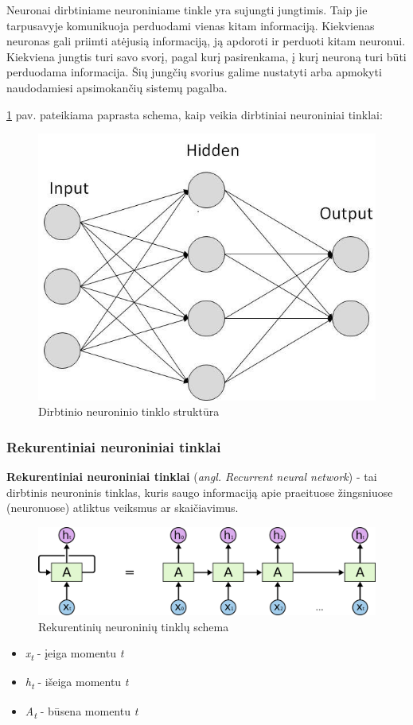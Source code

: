\documentclass{VUMIFInfKursinis}
\begin{document}
Neuronai dirbtiniame neuroniniame tinkle yra sujungti jungtimis. Taip jie tarpusavyje komunikuoja perduodami vienas kitam informaciją. Kiekvienas neuronas gali priimti atėjusią informaciją, ją apdoroti ir perduoti kitam neuronui. Kiekviena jungtis turi savo svorį, pagal kurį pasirenkama, į kurį neuroną turi būti perduodama informacija. Šių jungčių svorius galime nustatyti arba apmokyti naudodamiesi apsimokančių sistemų pagalba. 

\ref{img:ann} pav. pateikiama paprasta schema, kaip veikia dirbtiniai neuroniniai tinklai:

\begin{figure}[H]
	\centering
	\includegraphics[width=.4\linewidth]{img/ann}
	\caption{Dirbtinio neuroninio tinklo struktūra \cite{ArtificialNeuralNetwork}}
	\label{img:ann}
\end{figure}


\subsubsection{Rekurentiniai neuroniniai tinklai}
\textbf{Rekurentiniai neuroniniai tinklai} (\textit{angl. Recurrent neural network}) - tai dirbtinis neuroninis tinklas, kuris saugo informaciją apie praeituose žingsniuose (neuronuose) atliktus veiksmus ar skaičiavimus.

\begin{figure}[H]
	\centering
	\includegraphics[width=.8\linewidth]{img/rnn}
	\caption{Rekurentinių neuroninių tinklų schema \cite{RecurrentNeuralNetwork}}
	\label{img:rnn}
\end{figure}
\begin{itemize}
	\item \textit{x\textsubscript{t}} - įeiga momentu \textit{t}
	\item \textit{h\textsubscript{t}} - išeiga momentu \textit{t}	
	\item \textit{A\textsubscript{t}} - būsena momentu \textit{t}	
\end{itemize}
\end{document}
